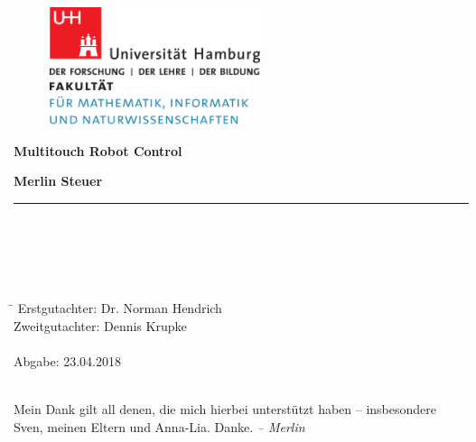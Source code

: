 \begin{titlepage}

  \setcounter{page}{-1}

	\begin{figure}[h]
		\begin{minipage}[b]{62mm}
			\includegraphics[width=62mm]{images/unilogo}
		\end{minipage}
		\hspace{4cm}
		\begin{minipage}[b]{59mm}
			\includegraphics[width=59mm]{images/minlogo}
		\end{minipage}
	\end{figure}

	\vfill
	
	\begin{center}
		\vspace{14mm}
		\noindent \textbf{\huge
		  Multitouch Robot Control \\
		}
		\vspace{60mm}	
	\end{center}
	
	\vfill
	
	\noindent \textbf{Merlin Steuer} \\
	\noindent \rule{\textwidth}{0.4mm} 
	 \\
	 \\
	 \\
	 \\
	\begin{tabbing}
	\hspace{8em} \=  \kill
	Erstgutachter: \> Dr. Norman Hendrich \\
	Zweitgutachter: \> Dennis Krupke \\
	~ \\
	Abgabe: 23.04.2018
	\end{tabbing}
	
	\newpage 
	\thispagestyle{empty}
	\setcounter{page}{0}

	~\\ \vfill \noindent 
	Mein Dank gilt all denen, die mich hierbei unterstützt haben -- insbesondere Sven, meinen Eltern und Anna-Lia. Danke.
	\textit{-- Merlin}
\end{titlepage}

